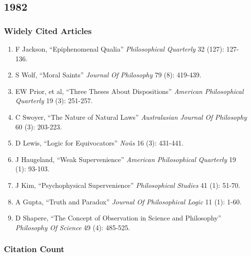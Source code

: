 \documentclass[
  10pt,
  letterpaper,
  DIV=11,
  numbers=noendperiod,
  twoside]{scrartcl}
\providecommand{\tightlist}{%
  \setlength{\itemsep}{0pt}\setlength{\parskip}{0pt}}\usepackage{longtable,booktabs,array}
\begin{document}
\newpage

\subsection{1982}\label{section-6}

\subsubsection*{Widely Cited Articles}\label{widely-cited-articles-6}

\begin{enumerate}
\def\labelenumi{\arabic{enumi}.}
\tightlist
\item
  F Jackson, ``Epiphenomenal Qualia'' \emph{Philosophical Quarterly} 32
  (127): 127-136.
\item
  S Wolf, ``Moral Saints'' \emph{Journal Of Philosophy} 79 (8): 419-439.
\item
  EW Prior, et al, ``Three Theses About Dispositions'' \emph{American
  Philosophical Quarterly} 19 (3): 251-257.
\item
  C Swoyer, ``The Nature of Natural Laws'' \emph{Australasian Journal Of
  Philosophy} 60 (3): 203-223.
\item
  D Lewis, ``Logic for Equivocators'' \emph{Noûs} 16 (3): 431-441.
\item
  J Haugeland, ``Weak Supervenience'' \emph{American Philosophical
  Quarterly} 19 (1): 93-103.
\item
  J Kim, ``Psychophysical Supervenience'' \emph{Philosophical Studies}
  41 (1): 51-70.
\item
  A Gupta, ``Truth and Paradox'' \emph{Journal Of Philosophical Logic}
  11 (1): 1-60.
\item
  D Shapere, ``The Concept of Observation in Science and Philosophy''
  \emph{Philosophy Of Science} 49 (4): 485-525.
\end{enumerate}

\subsubsection*{Citation Count}\label{citation-count-6}
\end{document}
